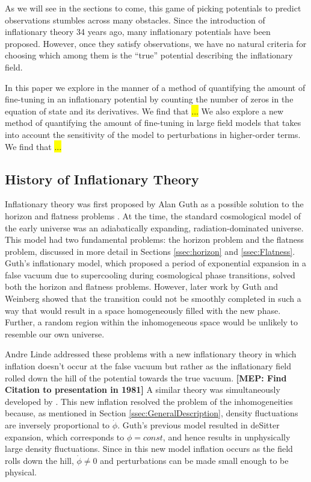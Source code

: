 \documentclass[onecolumn,apj]{emulateapj}
\newcommand{\mep}[1]{{\color{applegreen} \textbf{[MEP:  #1]}}}
\newcommand{\hl}[1]{\colorbox{yellow}{#1}}
\begin{document}
As we will see in the sections to come, this game of picking potentials to predict observations stumbles across many obstacles. Since the introduction of inflationary theory 34 years ago, many inflationary potentials have been proposed. However, once they satisfy observations, we have no natural criteria for choosing which among them is the ``true'' potential describing the inflationary field. 

In this paper we explore in the manner of \citet{Boyle+2006} a method of quantifying the amount of fine-tuning in an inflationary potential by counting the number of zeros in the equation of state and its derivatives. We find that \hl{...} We also explore a new method of quantifying the amount of fine-tuning in large field models that takes into account the sensitivity of the model to perturbations in higher-order terms. We find that \hl{...}

\subsection{History of Inflationary Theory}
\label{ssec:History}
Inflationary theory was first proposed by Alan Guth as a possible solution to the horizon and flatness problems \citep{Guth1981}. At the time, the standard cosmological model of the early universe was an adiabatically expanding, radiation-dominated universe. This model had two fundamental problems: the horizon problem and the flatness problem, discussed in more detail in Sections \ref{ssec:horizon} and \ref{ssec:Flatness}. Guth's inflationary model, which proposed a period of exponential expansion in a false vacuum due to supercooling during cosmological phase transitions, solved both the horizon and flatness problems.  However, later work by Guth and Weinberg \citep{Guth+Weinberg1983} showed that the transition could not be smoothly completed in such a way that would result in a space homogeneously filled with the new phase. Further, a random region within the inhomogeneous space would be unlikely to resemble our own universe. 

Andre Linde addressed these problems with a new inflationary theory in which inflation doesn't occur at the false vacuum but rather as the inflationary field rolled down the hill of the potential towards the true vacuum. \mep{Find Citation to presentation in 1981} A similar theory was simultaneously developed by \citet{Albrecht+Steinhardt1982}. This new inflation resolved the problem of the inhomogeneities because, as mentioned in Section \ref{ssec:GeneralDescription}, density fluctuations are inversely proportional to $\dot \phi$. Guth's previous model resulted in deSitter expansion, which corresponds to $\phi=const$, and hence results in unphysically large density fluctuations. Since in this new model inflation occurs as the field rolls down the hill, $\dot \phi \neq 0$ and perturbations can be made small enough to be physical. 
\end{document}
